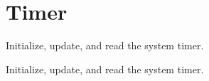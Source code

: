 \hypertarget{group__timer}{\section{Timer}
\label{group__timer}
}


Initialize, update, and read the system timer.  


Initialize, update, and read the system timer. 